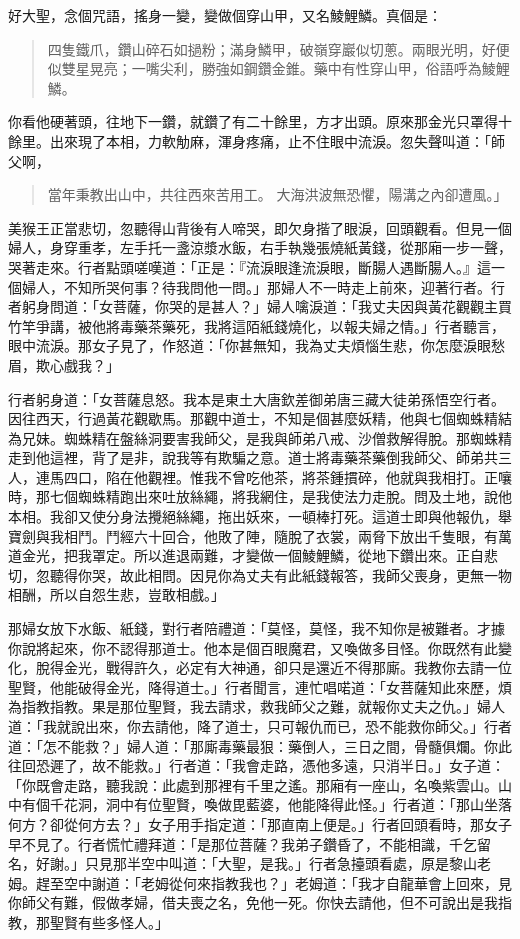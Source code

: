 好大聖，念個咒語，搖身一變，變做個穿山甲，又名鯪鯉鱗。真個是：
\begin{quote}
四隻鐵爪，鑽山碎石如撾粉；滿身鱗甲，破嶺穿巖似切蔥。兩眼光明，好便似雙星晃亮；一嘴尖利，勝強如鋼鑽金錐。藥中有性穿山甲，俗語呼為鯪鯉鱗。
\end{quote}

你看他硬著頭，往地下一鑽，就鑽了有二十餘里，方才出頭。原來那金光只罩得十餘里。出來現了本相，力軟觔麻，渾身疼痛，止不住眼中流淚。忽失聲叫道：「師父啊，
\begin{quote}
當年秉教出山中，共往西來苦用工。
大海洪波無恐懼，陽溝之內卻遭風。」
\end{quote}

美猴王正當悲切，忽聽得山背後有人啼哭，即欠身揩了眼淚，回頭觀看。但見一個婦人，身穿重孝，左手托一盞涼漿水飯，右手執幾張燒紙黃錢，從那廂一步一聲，哭著走來。行者點頭嗟嘆道：「正是：『流淚眼逢流淚眼，斷腸人遇斷腸人。』這一個婦人，不知所哭何事？待我問他一問。」那婦人不一時走上前來，迎著行者。行者躬身問道：「女菩薩，你哭的是甚人？」婦人噙淚道：「我丈夫因與黃花觀觀主買竹竿爭講，被他將毒藥茶藥死，我將這陌紙錢燒化，以報夫婦之情。」行者聽言，眼中流淚。那女子見了，作怒道：「你甚無知，我為丈夫煩惱生悲，你怎麼淚眼愁眉，欺心戲我？」

行者躬身道：「女菩薩息怒。我本是東土大唐欽差御弟唐三藏大徒弟孫悟空行者。因往西天，行過黃花觀歇馬。那觀中道士，不知是個甚麼妖精，他與七個蜘蛛精結為兄妹。蜘蛛精在盤絲洞要害我師父，是我與師弟八戒、沙僧救解得脫。那蜘蛛精走到他這裡，背了是非，說我等有欺騙之意。道士將毒藥茶藥倒我師父、師弟共三人，連馬四口，陷在他觀裡。惟我不曾吃他茶，將茶鍾摜碎，他就與我相打。正嚷時，那七個蜘蛛精跑出來吐放絲繩，將我網住，是我使法力走脫。問及土地，說他本相。我卻又使分身法攪絕絲繩，拖出妖來，一頓棒打死。這道士即與他報仇，舉寶劍與我相鬥。鬥經六十回合，他敗了陣，隨脫了衣裳，兩脅下放出千隻眼，有萬道金光，把我罩定。所以進退兩難，才變做一個鯪鯉鱗，從地下鑽出來。正自悲切，忽聽得你哭，故此相問。因見你為丈夫有此紙錢報答，我師父喪身，更無一物相酬，所以自怨生悲，豈敢相戲。」

那婦女放下水飯、紙錢，對行者陪禮道：「莫怪，莫怪，我不知你是被難者。才據你說將起來，你不認得那道士。他本是個百眼魔君，又喚做多目怪。你既然有此變化，脫得金光，戰得許久，必定有大神通，卻只是還近不得那廝。我教你去請一位聖賢，他能破得金光，降得道士。」行者聞言，連忙唱喏道：「女菩薩知此來歷，煩為指教指教。果是那位聖賢，我去請求，救我師父之難，就報你丈夫之仇。」婦人道：「我就說出來，你去請他，降了道士，只可報仇而已，恐不能救你師父。」行者道：「怎不能救？」婦人道：「那廝毒藥最狠：藥倒人，三日之間，骨髓俱爛。你此往回恐遲了，故不能救。」行者道：「我會走路，憑他多遠，只消半日。」女子道：「你既會走路，聽我說：此處到那裡有千里之遙。那廂有一座山，名喚紫雲山。山中有個千花洞，洞中有位聖賢，喚做毘藍婆，他能降得此怪。」行者道：「那山坐落何方？卻從何方去？」女子用手指定道：「那直南上便是。」行者回頭看時，那女子早不見了。行者慌忙禮拜道：「是那位菩薩？我弟子鑽昏了，不能相識，千乞留名，好謝。」只見那半空中叫道：「大聖，是我。」行者急擡頭看處，原是黎山老姆。趕至空中謝道：「老姆從何來指教我也？」老姆道：「我才自龍華會上回來，見你師父有難，假做孝婦，借夫喪之名，免他一死。你快去請他，但不可說出是我指教，那聖賢有些多怪人。」

